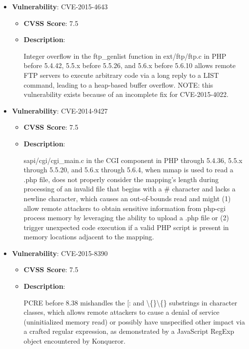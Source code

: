 \documentclass{article}
\begin{document}
\begin{itemize}
        \item \textbf{Vulnerability}: CVE-2015-4643
        \begin{itemize}
            \item \textbf{CVSS Score}:  7.5 
            \item \textbf{Description}:
            \parbox[t]{0.9\linewidth}{
                \ttfamily Integer overflow in the ftp\_genlist function in ext/ftp/ftp.c in PHP before 5.4.42, 5.5.x before 5.5.26, and 5.6.x before 5.6.10 allows remote FTP servers to execute arbitrary code via a long reply to a LIST command, leading to a heap-based buffer overflow.  NOTE: this vulnerability exists because of an incomplete fix for CVE-2015-4022.
            }
        \end{itemize}
    
        \item \textbf{Vulnerability}: CVE-2014-9427
        \begin{itemize}
            \item \textbf{CVSS Score}:  7.5 
            \item \textbf{Description}:
            \parbox[t]{0.9\linewidth}{
                \ttfamily sapi/cgi/cgi\_main.c in the CGI component in PHP through 5.4.36, 5.5.x through 5.5.20, and 5.6.x through 5.6.4, when mmap is used to read a .php file, does not properly consider the mapping's length during processing of an invalid file that begins with a \# character and lacks a newline character, which causes an out-of-bounds read and might (1) allow remote attackers to obtain sensitive information from php-cgi process memory by leveraging the ability to upload a .php file or (2) trigger unexpected code execution if a valid PHP script is present in memory locations adjacent to the mapping.
            }
        \end{itemize}
    
        \item \textbf{Vulnerability}: CVE-2015-8390
        \begin{itemize}
            \item \textbf{CVSS Score}:  7.5 
            \item \textbf{Description}:
            \parbox[t]{0.9\linewidth}{
                \ttfamily PCRE before 8.38 mishandles the [: and \textbackslash\{\}\textbackslash\{\} substrings in character classes, which allows remote attackers to cause a denial of service (uninitialized memory read) or possibly have unspecified other impact via a crafted regular expression, as demonstrated by a JavaScript RegExp object encountered by Konqueror.
            }
        \end{itemize}
    

\end{itemize}
\end{document}
